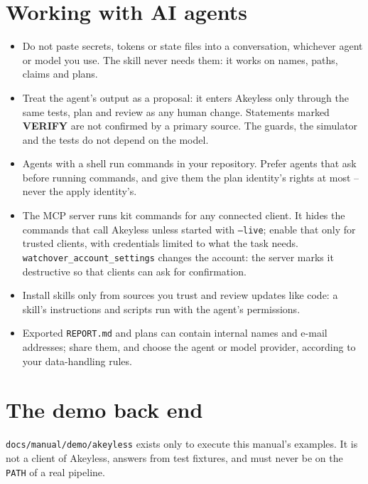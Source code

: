 \section{Working with AI agents}
\begin{itemize}
\item Do not paste secrets, tokens or state files into a conversation, whichever agent or model you
  use. The skill never needs them: it works on names, paths, claims and plans.
\item Treat the agent's output as a proposal: it enters Akeyless only through the same tests,
  plan and review as any human change. Statements marked \textbf{VERIFY} are not confirmed by a
  primary source. The guards, the simulator and the tests do not depend on the model.
\item Agents with a shell run commands in your repository. Prefer agents that ask before running
  commands, and give them the plan identity's rights at most -- never the apply identity's.
\item The MCP server runs kit commands for any connected client. It hides the commands that call
  Akeyless unless started with \texttt{--live}; enable that only for trusted clients, with
  credentials limited to what the task needs. \texttt{watchover\_account\_settings} changes the
  account: the server marks it destructive so that clients can ask for confirmation.
\item Install skills only from sources you trust and review updates like code: a skill's
  instructions and scripts run with the agent's permissions.
\item Exported \texttt{REPORT.md} and plans can contain internal names and e-mail addresses; share
  them, and choose the agent or model provider, according to your data-handling rules.
\end{itemize}

\section{The demo back end}
\texttt{docs/manual/demo/akeyless} exists only to execute this manual's examples. It is not a
client of Akeyless, answers from test fixtures, and must never be on the \texttt{PATH} of a real
pipeline.
